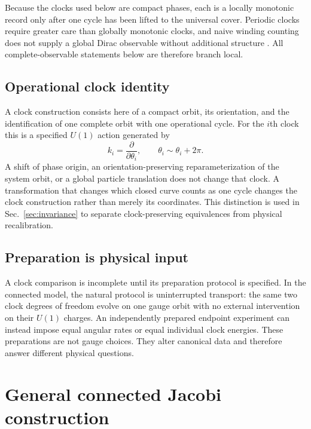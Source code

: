 \documentclass[11pt]{article}
\theoremstyle{plain}
\begin{document}
Because the clocks used below are compact phases, each is a locally monotonic record only after one cycle has been lifted to the universal cover. Periodic clocks require greater care than globally monotonic clocks, and naive winding counting does not supply a global Dirac observable without additional structure \cite{Chataignier}. All complete-observable statements below are therefore branch local.

\subsection{Operational clock identity}

A clock construction consists here of a compact orbit, its orientation, and the identification of one complete orbit with one operational cycle. For the $i$th clock this is a specified $U(1)$ action generated by
\begin{equation}
k_i=\frac{\partial}{\partial\theta_i},\qquad \theta_i\sim\theta_i+2\pi.
\end{equation}
A shift of phase origin, an orientation-preserving reparameterization of the system orbit, or a global particle translation does not change that clock. A transformation that changes which closed curve counts as one cycle changes the clock construction rather than merely its coordinates. This distinction is used in Sec.~\ref{sec:invariance} to separate clock-preserving equivalences from physical recalibration.

\subsection{Preparation is physical input}

A clock comparison is incomplete until its preparation protocol is specified. In the connected model, the natural protocol is uninterrupted transport: the same two clock degrees of freedom evolve on one gauge orbit with no external intervention on their $U(1)$ charges. An independently prepared endpoint experiment can instead impose equal angular rates or equal individual clock energies. These preparations are not gauge choices. They alter canonical data and therefore answer different physical questions.

\section{General connected Jacobi construction}
\end{document}
